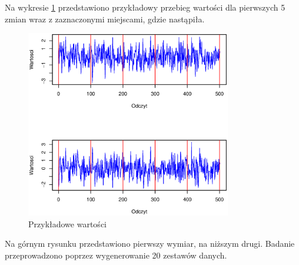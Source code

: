 Na wykresie \ref{fig:CovValues} przedstawiono przykładowy przebieg wartości dla pierwszych 5 zmian
wraz z zaznaczonymi miejscami,
gdzie nastąpiła.
\begin{figure}[htbp]
  \centering
  \includegraphics[width=0.8\textwidth]{img/ch-5-cov}
  \caption{Przykładowe wartości}
  \label{fig:CovValues}
\end{figure}
Na górnym rysunku przedstawiono pierwszy wymiar, na niższym drugi.
Badanie przeprowadzono poprzez wygenerowanie 20 zestawów danych.
